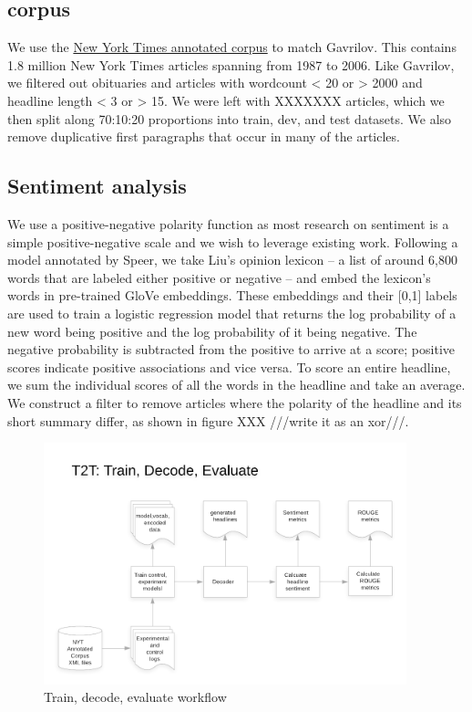 \documentclass[11pt]{article}
\begin{document}
\subsection{corpus}
We use the \href{https://catalog.ldc.upenn.edu/LDC2008T19}{New York Times annotated corpus} to match Gavrilov. This contains 1.8 million New York Times articles spanning from 1987 to 2006. Like Gavrilov, we filtered out obituaries and articles with wordcount < 20 or > 2000 and headline length < 3 or > 15. We were left with XXXXXXX articles, which we then split along 70:10:20 proportions into train, dev, and test datasets. We also remove duplicative first paragraphs that occur in many of the articles. 

\subsection{Sentiment analysis}
We use a positive-negative polarity function as most research on sentiment is a simple positive-negative scale and we wish to leverage existing work. Following a model annotated by Speer\cite{RacistAI}, we take Liu's opinion lexicon\cite{Hu:2004:MSC:1014052.1014073} -- a list of around 6,800 words that are labeled either positive or negative -- and embed the lexicon's words in pre-trained GloVe embeddings. These embeddings and their [0,1] labels are used to train a logistic regression model that returns the log probability of a new word being positive and the log probability of it being negative. The negative probability is subtracted from the positive to arrive at a score; positive scores indicate positive associations and vice versa. To score an entire headline, we sum the individual scores of all the words in the headline and take an average. We construct a filter to remove articles where the polarity of the headline and its short summary differ, as shown in figure XXX ///write it as an xor///.

\begin{figure}
  \includegraphics[width=\textwidth,height=7cm]{Headgen_train.png}
  \caption{Train, decode, evaluate workflow}
\end{figure}
\end{document}
